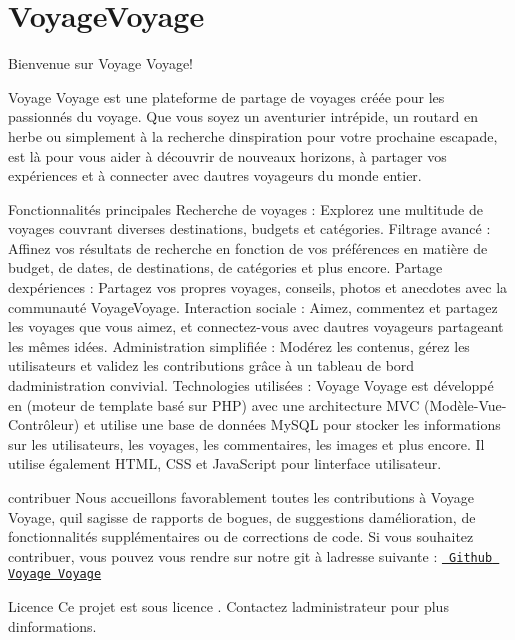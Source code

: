 \chapter{Voyage\+Voyage}
\hypertarget{index}{}\label{index}
\label{index_md__c_1_2wamp64_2www_2projet__2_2_r_e_a_d_m_e}%
%
 Bienvenue sur Voyage Voyage!

Voyage Voyage est une plateforme de partage de voyages créée pour les passionnés du voyage. Que vous soyez un aventurier intrépide, un routard en herbe ou simplement à la recherche d\textquotesingle{}inspiration pour votre prochaine escapade,  est là pour vous aider à découvrir de nouveaux horizons, à partager vos expériences et à connecter avec d\textquotesingle{}autres voyageurs du monde entier.

Fonctionnalités principales Recherche de voyages \+: Explorez une multitude de voyages couvrant diverses destinations, budgets et catégories. Filtrage avancé \+: Affinez vos résultats de recherche en fonction de vos préférences en matière de budget, de dates, de destinations, de catégories et plus encore. Partage d\textquotesingle{}expériences \+: Partagez vos propres voyages, conseils, photos et anecdotes avec la communauté Voyage\+Voyage. Interaction sociale \+: Aimez, commentez et partagez les voyages que vous aimez, et connectez-\/vous avec d\textquotesingle{}autres voyageurs partageant les mêmes idées. Administration simplifiée \+: Modérez les contenus, gérez les utilisateurs et validez les contributions grâce à un tableau de bord d\textquotesingle{}administration convivial. Technologies utilisées \+: Voyage Voyage est développé en  (moteur de template basé sur PHP) avec une architecture MVC (Modèle-\/\+Vue-\/\+Contrôleur) et utilise une base de données My\+SQL pour stocker les informations sur les utilisateurs, les voyages, les commentaires, les images et plus encore. Il utilise également HTML, CSS et Java\+Script pour l\textquotesingle{}interface utilisateur.

 contribuer Nous accueillons favorablement toutes les contributions à Voyage Voyage, qu\textquotesingle{}il s\textquotesingle{}agisse de rapports de bogues, de suggestions d\textquotesingle{}amélioration, de fonctionnalités supplémentaires ou de corrections de code. Si vous souhaitez contribuer, vous pouvez vous rendre sur notre git à l\textquotesingle{}adresse suivante \+: \href{https://github.com/Gutsey68/projet_2.git}{\texttt{ Github Voyage Voyage}}

Licence Ce projet est sous licence . Contactez l\textquotesingle{}administrateur pour plus d\textquotesingle{}informations. 